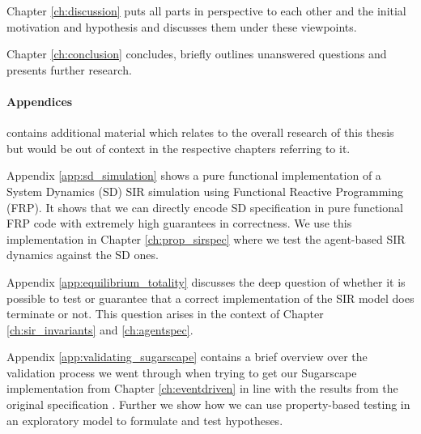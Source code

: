 
Chapter \ref{ch:discussion} puts all parts in perspective to each other and the initial motivation and hypothesis and discusses them under these viewpoints.

\medskip

Chapter \ref{ch:conclusion} concludes, briefly outlines unanswered questions and presents further research.

\paragraph{Appendices} contains additional material which relates to the overall research of this thesis but would be out of context in the respective chapters referring to it.
\medskip

Appendix \ref{app:sd_simulation} shows a pure functional implementation of a System Dynamics (SD) SIR simulation using Functional Reactive Programming (FRP). It shows that we can directly encode SD specification in pure functional FRP code with extremely high guarantees in correctness. We use this implementation in Chapter \ref{ch:prop_sirspec} where we test the agent-based SIR dynamics against the SD ones.

\medskip

Appendix \ref{app:equilibrium_totality} discusses the deep question of whether it is possible to test or guarantee that a correct implementation of the SIR model does terminate or not. This question arises in the context of Chapter \ref{ch:sir_invariants} and \ref{ch:agentspec}.

\medskip

Appendix \ref{app:validating_sugarscape} contains a brief overview over the validation process we went through when trying to get our Sugarscape implementation from Chapter \ref{ch:eventdriven} in line with the results from the original specification \cite{epstein_growing_1996}. Further we show how we can use property-based testing in an exploratory model to formulate and test hypotheses.